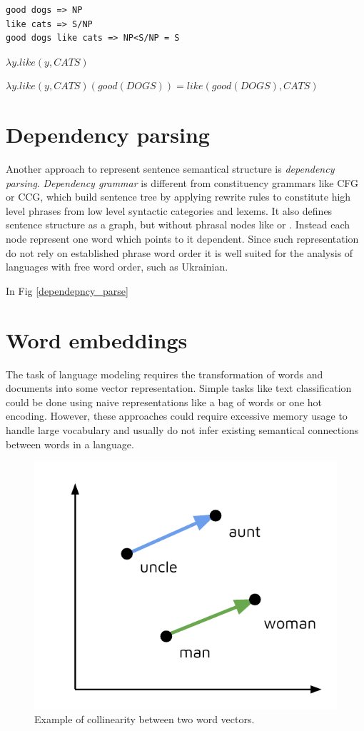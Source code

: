 \begin{verbatim}
good dogs => NP
like cats => S/NP
good dogs like cats => NP<S/NP = S
\end{verbatim}

$\lambda y.like(y, CATS)$

$\lambda y.like(y, CATS)(good(DOGS))=like(good(DOGS), CATS)$

\section{Dependency parsing}
Another approach to represent sentence semantical structure is \emph{dependency parsing}. \emph{Dependency grammar} is different from constituency grammars like CFG or CCG, which build sentence tree by applying rewrite rules to constitute high level phrases from low level syntactic categories and lexems. It also defines sentence structure as a graph, but without phrasal nodes like  or . Instead each node represent one word which points to it dependent. Since such representation do not rely on established phrase word order it is well suited for the analysis of languages with free word order, such as Ukrainian.

In Fig \ref{dependepncy_parse}

\section{Word embeddings}
The task of language modeling requires the transformation of words and documents into some vector representation. Simple tasks like text classification could be done using naive representations like a bag of words or one hot encoding. However, these approaches could require excessive memory usage to handle large vocabulary and usually do not infer existing semantical connections between words in a language. 

\begin{figure}
\centering
\includegraphics{Figures/word_embeddings}
\decoRule
\caption[Word vectors]{Example of collinearity between two word vectors.}
\label{fig:word_embeddings}
\end{figure}

